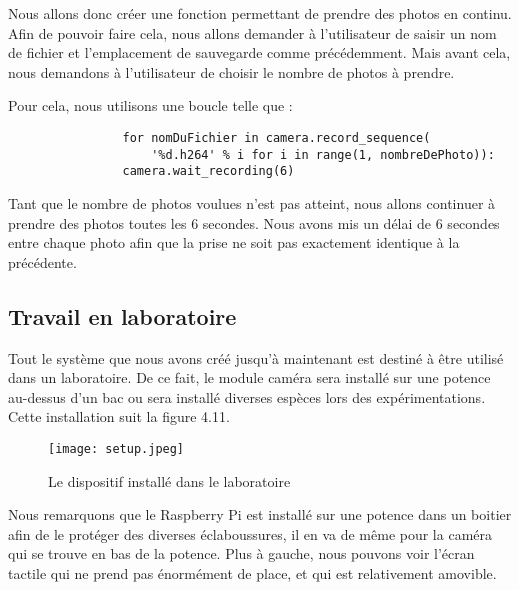         \vspace{0.2cm}

        Nous allons donc créer une fonction permettant de prendre des photos en continu.
        Afin de pouvoir faire cela, nous allons demander à l'utilisateur de saisir un nom de fichier et l'emplacement de sauvegarde comme précédemment.
        Mais avant cela, nous demandons à l'utilisateur de choisir le nombre de photos à prendre.

        \begin{flushleft}
            Pour cela, nous utilisons une boucle telle que : 
            \begin{verbatim}
                for nomDuFichier in camera.record_sequence(
                    '%d.h264' % i for i in range(1, nombreDePhoto)):
                camera.wait_recording(6)
            \end{verbatim}            
        \end{flushleft}

        Tant que le nombre de photos voulues n'est pas atteint, nous allons continuer à prendre des photos toutes les 6 secondes. Nous avons mis un délai de 6 secondes entre chaque photo afin que la prise ne soit pas exactement identique à la précédente.
    
        \subsection{Travail en laboratoire}
        Tout le système que nous avons créé jusqu'à maintenant est destiné à être utilisé dans un laboratoire. De ce fait, le module caméra sera installé sur une potence au-dessus d'un bac ou sera installé diverses espèces lors des expérimentations. Cette installation suit la figure 4.11.

        \begin{figure}[ht]
            \centering
            \texttt{[image: setup.jpeg]} 
            \caption{Le dispositif installé dans le laboratoire}
        \end{figure} 

        Nous remarquons que le Raspberry Pi est installé sur une potence dans un boitier afin de le protéger des diverses éclaboussures, il en va de même pour la caméra qui se trouve en bas de la potence. Plus à gauche, nous pouvons voir l'écran tactile qui ne prend pas énormément de place, et qui est relativement amovible.

        \vspace{0.2cm}


